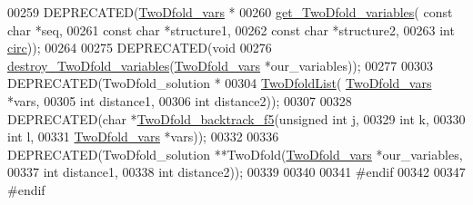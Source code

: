 \begin{DoxyCode}
00259 DEPRECATED(\mbox{\hyperlink{group__kl__neighborhood__mfe_structTwoDfold__vars}{TwoDfold\_vars}} *
00260 \mbox{\hyperlink{group__kl__neighborhood__mfe_gac9284f132cf0eaa0a2f43590eda05488}{get\_TwoDfold\_variables}}( \textcolor{keyword}{const} \textcolor{keywordtype}{char} *seq,
00261                         \textcolor{keyword}{const} \textcolor{keywordtype}{char} *structure1,
00262                         \textcolor{keyword}{const} \textcolor{keywordtype}{char} *structure2,
00263                         \textcolor{keywordtype}{int} \mbox{\hyperlink{group__model__details_gaf9202a1a09f5828dc731e2d9a10fa111}{circ}}));
00264 
00275 DEPRECATED(\textcolor{keywordtype}{void} 
00276 \mbox{\hyperlink{group__kl__neighborhood__mfe_ga05bf4f31d216b1b160fd2d3d68e9b487}{destroy\_TwoDfold\_variables}}(\mbox{\hyperlink{group__kl__neighborhood__mfe_structTwoDfold__vars}{TwoDfold\_vars}} *our\_variables));
00277 
00303 DEPRECATED(TwoDfold\_solution *
00304 \mbox{\hyperlink{group__kl__neighborhood__mfe_ga7fc5e3e92fe97914ca4eccd33c01c2a7}{TwoDfoldList}}( \mbox{\hyperlink{group__kl__neighborhood__mfe_structTwoDfold__vars}{TwoDfold\_vars}} *vars,
00305               \textcolor{keywordtype}{int} distance1,
00306               \textcolor{keywordtype}{int} distance2));
00307 
00328 DEPRECATED(\textcolor{keywordtype}{char} *\mbox{\hyperlink{group__kl__neighborhood__mfe_gaf4dc05bf8fc1ea53acd7aeb798ba80c2}{TwoDfold\_backtrack\_f5}}(\textcolor{keywordtype}{unsigned} \textcolor{keywordtype}{int} j,
00329                             \textcolor{keywordtype}{int} k,
00330                             \textcolor{keywordtype}{int} l,
00331                             \mbox{\hyperlink{group__kl__neighborhood__mfe_structTwoDfold__vars}{TwoDfold\_vars}} *vars));
00332 
00336 DEPRECATED(TwoDfold\_solution **TwoDfold(\mbox{\hyperlink{group__kl__neighborhood__mfe_structTwoDfold__vars}{TwoDfold\_vars}} *our\_variables,
00337                                         \textcolor{keywordtype}{int} distance1,
00338                                         \textcolor{keywordtype}{int} distance2));
00339 
00340 
00341 \textcolor{preprocessor}{#endif}
00342 
00347 \textcolor{preprocessor}{#endif}
\end{DoxyCode}
